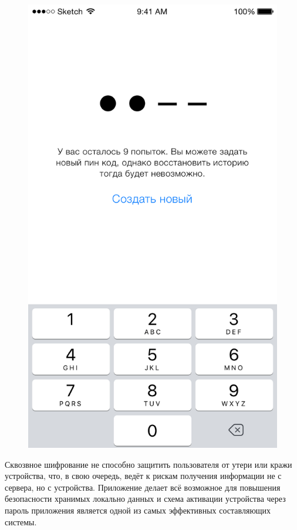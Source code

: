 \begin{figure}[h]
\begin{minipage}{.33\textwidth}
  \includegraphics[height=0.25\textheight]{inc/img/ui/pin_core_reset.png}
  \label{sec:usage:pin:reset}
\end{minipage}
\end{figure}

Сквозвное шифрование не способно защитить пользователя от утери или кражи устройства, что, в свою очередь, ведёт к рискам получения информации не с сервера, но с устройства. Приложение делает всё возможное для повышения безопасности хранимых локально данных и схема активации устройства через пароль приложения является одной из самых эффективных составляющих системы.
